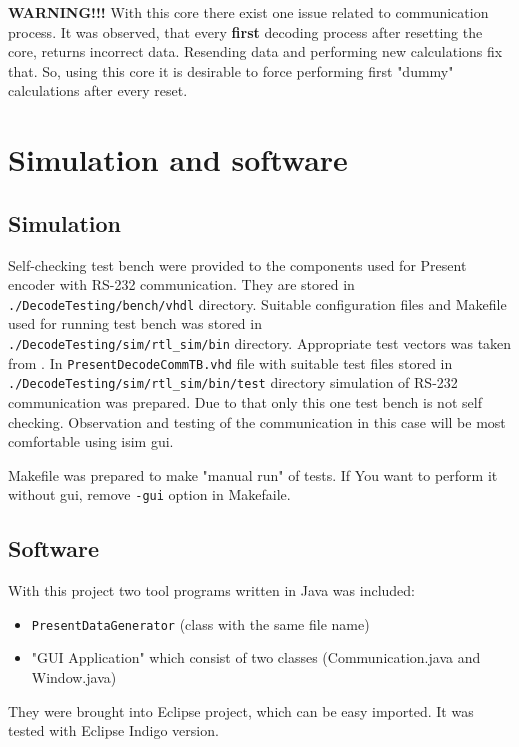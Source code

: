 \documentclass{gajewski}
\begin{document}
\textbf{WARNING!!!}
With this core there exist one issue related to communication process. It was observed, that every \textbf{first} decoding process after resetting the core, returns incorrect data. Resending data and performing new calculations fix that. So, using this core it is desirable to force performing first "dummy" calculations after every reset.


\newpage

\section{Simulation and software}

\subsection{Simulation}

Self-checking test bench were provided to the components used for Present encoder with RS-232 communication. They are stored in \texttt{./DecodeTesting/bench/vhdl} directory. Suitable configuration files and Makefile used for running test bench was stored in \\
\texttt{./DecodeTesting/sim/rtl\_sim/bin} directory. Appropriate test vectors was taken from \cite{PRESENT}. In \texttt{PresentDecodeCommTB.vhd} file with suitable test files stored in \\
\texttt{./DecodeTesting/sim/rtl\_sim/bin/test} directory simulation of RS-232 communication was prepared. Due to that only this one test bench is not self checking. Observation and testing of the communication in this case will be most comfortable using isim gui.

Makefile was prepared to make "manual run" of tests. If You want to perform it without gui, remove \texttt{-gui} option in Makefaile.

\subsection{Software}

With this project two tool programs written in Java was included:
\begin{itemize}
    \item \texttt{PresentDataGenerator} (class with the same file name)
    \item "GUI Application" which consist of two classes (Communication.java and Window.java)
\end{itemize}
They were brought into Eclipse project, which can be easy imported. It was tested with Eclipse Indigo version.
\end{document}
